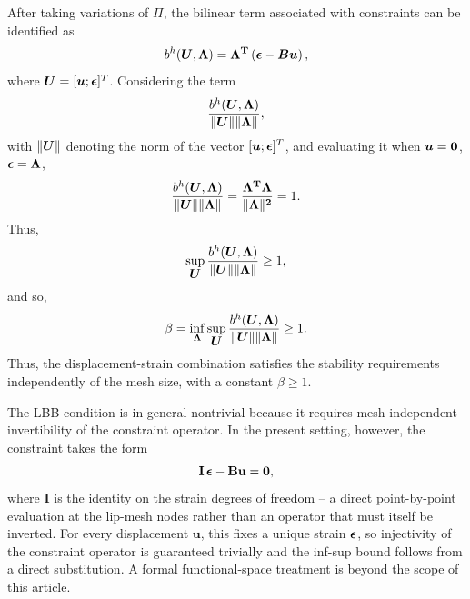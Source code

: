 \documentclass[10pt,review]{cas-sc}
\begin{document}
After taking variations of $\Pi$, the bilinear term associated with constraints can be identified as
\begin{equation}
	b^h(\mbox{\boldmath $U$},\bf \Lambda) = \bf \Lambda ^T \left(\mbox{\boldmath $\epsilon$} - \mbox{\boldmath $B$} \mbox{\boldmath $u$} \right),
\end{equation}
where $\mbox{\boldmath $U$} = [\mbox{\boldmath $u$} ; \mbox{\boldmath $\epsilon$} ]^T$. Considering the term 
\[    \frac{ b^h(\mbox{\boldmath $U$},\bf \Lambda)}{\|\mbox{\boldmath $U$} \| \| \bf \Lambda\|} , \]
with $ \|\mbox{\boldmath $U$} \|$ denoting the norm of the vector $[\mbox{\boldmath $u$} ; \mbox{\boldmath $\epsilon$} ]^T$, and evaluating it when $\mbox{\boldmath $u$} = \bf 0$, $\mbox{\boldmath $\epsilon$} = \bf \Lambda$,
\begin{equation}
	\frac{ b^h(\mbox{\boldmath $U$},\bf \Lambda)}{\|\mbox{\boldmath $U$} \| \| \bf \Lambda\|} =  \frac{\bf \Lambda ^T \bf \Lambda }{\| \bf \Lambda\|^2} = 1.
\end{equation}
Thus,
\begin{equation}
	\sup _{\mbox{\boldmath $U$}} \frac{ b^h(\mbox{\boldmath $U$},\bf \Lambda)}{\|\mbox{\boldmath $U$} \| \| \bf \Lambda\|}  \geq 1,
\end{equation}
and so,
\begin{equation}
	\beta = \inf_{\bf \Lambda} \sup _{\mbox{\boldmath $U$}} 	\frac{ b^h(\mbox{\boldmath $U$},\bf \Lambda)}{\|\mbox{\boldmath $U$} \| \| \bf \Lambda\|}  \geq 1.
\end{equation}
Thus, the displacement-strain combination satisfies the stability requirements independently of the mesh size, with a constant $\beta \geq 1$. 

The LBB condition is in general nontrivial because it requires mesh-independent invertibility of the constraint operator. In the present setting, however, the constraint takes the form
\begin{equation*}
	\mathbf{I}\,\mbox{\boldmath $\epsilon$} - \mathbf{B}\mathbf{u} = \mathbf{0},
\end{equation*}
where $\mathbf{I}$ is the identity on the strain degrees of freedom -- a direct point-by-point evaluation at the lip-mesh nodes rather than an operator that must itself be inverted. For every displacement $\mathbf{u}$, this fixes a unique strain $\mbox{\boldmath $\epsilon$}$, so injectivity of the constraint operator is guaranteed trivially and the inf-sup bound follows from a direct substitution. A formal functional-space treatment is beyond the scope of this article.
	
%
%
%
\printbibliography
\end{document}
